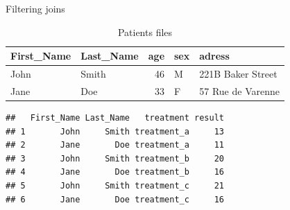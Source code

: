 \documentclass[14pt,ignorenonframetext,]{bredelebeamer}
\newenvironment{Shaded}{\begin{snugshade}}{\end{snugshade}}
\newcommand{\KeywordTok}[1]{\textcolor[rgb]{0.94,0.87,0.69}{#1}}
\newcommand{\DataTypeTok}[1]{\textcolor[rgb]{0.87,0.87,0.75}{#1}}
\newcommand{\DecValTok}[1]{\textcolor[rgb]{0.86,0.86,0.80}{#1}}
\newcommand{\StringTok}[1]{\textcolor[rgb]{0.80,0.58,0.58}{#1}}
\newcommand{\OperatorTok}[1]{\textcolor[rgb]{0.94,0.94,0.82}{#1}}
\newcommand{\NormalTok}[1]{\textcolor[rgb]{0.80,0.80,0.80}{#1}}
\begin{document}
\begin{frame}[fragile]{Filtering joins}

\begin{table}[t]

\caption{\label{tab:unnamed-chunk-53}Patients files}
\centering
\begin{tabular}{l|l|r|l|l}
\hline
First\_Name & Last\_Name & age & sex & adress\\
\hline
John & Smith & 46 & M & 221B Baker Street\\
\hline
Jane & Doe & 33 & F & 57 Rue de Varenne\\
\hline
\end{tabular}
\end{table}

\begin{Shaded}
\end{Shaded}

\begin{verbatim}
##   First_Name Last_Name   treatment result
## 1       John     Smith treatment_a     13
## 2       Jane       Doe treatment_a     11
## 3       John     Smith treatment_b     20
## 4       Jane       Doe treatment_b     16
## 5       John     Smith treatment_c     21
## 6       Jane       Doe treatment_c     16
\end{verbatim}

\end{frame}
\end{document}
